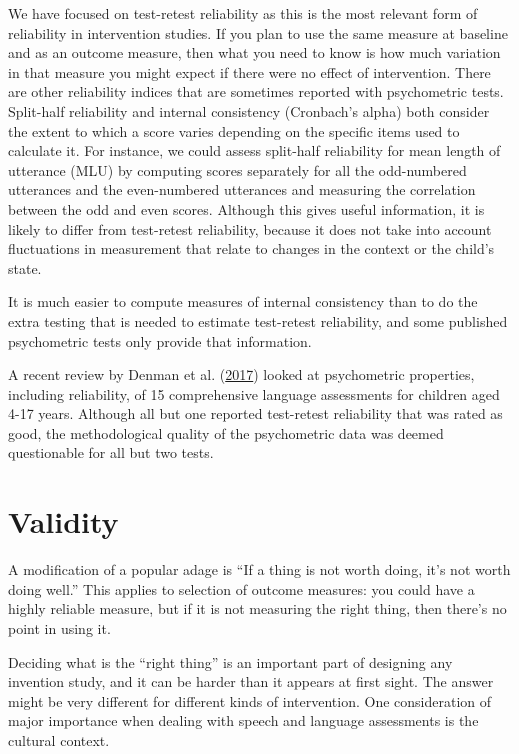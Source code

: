\documentclass{krantz}
\begin{document}
We have focused on test-retest reliability as this is the most relevant form of reliability in intervention studies. If you plan to use the same measure at baseline and as an outcome measure, then what you need to know is how much variation in that measure you might expect if there were no effect of intervention. There are other reliability indices that are sometimes reported with psychometric tests. Split-half reliability and internal consistency (Cronbach's alpha) both consider the extent to which a score varies depending on the specific items used to calculate it. For instance, we could assess split-half reliability for mean length of utterance (MLU) by computing scores separately for all the odd-numbered utterances and the even-numbered utterances and measuring the correlation between the odd and even scores. Although this gives useful information, it is likely to differ from test-retest reliability, because it does not take into account fluctuations in measurement that relate to changes in the context or the child's state.

It is much easier to compute measures of internal consistency than to do the extra testing that is needed to estimate test-retest reliability, and some published psychometric tests only provide that information.

A recent review by Denman et al. (\protect\hyperlink{ref-denman2017}{2017}) looked at psychometric properties, including reliability, of 15 comprehensive language assessments for children aged 4-17 years. Although all but one reported test-retest reliability that was rated as good, the methodological quality of the psychometric data was deemed questionable for all but two tests.

\hypertarget{validity}{%
\section{Validity}\label{validity}}

A modification of a popular adage is ``If a thing is not worth doing, it's not worth doing well.'' This applies to selection of outcome measures: you could have a highly reliable measure, but if it is not measuring the right thing, then there's no point in using it.

Deciding what is the ``right thing'' is an important part of designing any invention study, and it can be harder than it appears at first sight. The answer might be very different for different kinds of intervention. One consideration of major importance when dealing with speech and language assessments is the cultural context.
\end{document}
